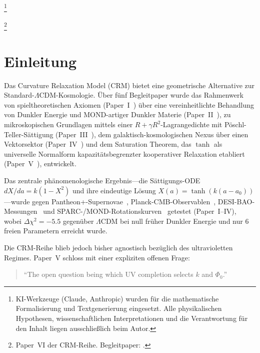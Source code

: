 \documentclass[aps,prd,twocolumn,superscriptaddress,nofootinbib]{revtex4-2}
\begin{document}

\thanks{KI-Werkzeuge (Claude, Anthropic) wurden für die mathematische Formalisierung und Textgenerierung eingesetzt. Alle physikalischen Hypothesen, wissenschaftlichen Interpretationen und die Verantwortung für den Inhalt liegen ausschließlich beim Autor.}

\thanks{Paper~VI der CRM-Reihe. Begleitpaper: \cite{Geiger2026,Geiger2026b,Geiger2026c,Geiger2026d,Geiger2026e}.}

\maketitle


\section{Einleitung}
\label{sec:introduction}

Das Curvature Relaxation Model (CRM) bietet eine geometrische Alternative zur Standard-$\Lambda$CDM-Kosmologie. Über fünf Begleitpaper wurde das Rahmenwerk von spieltheoretischen Axiomen (Paper~I~\cite{Geiger2026}) über eine vereinheitlichte Behandlung von Dunkler Energie und MOND-artiger Dunkler Materie (Paper~II~\cite{Geiger2026b}), zu mikroskopischen Grundlagen mittels einer $R + \gamma R^2$-Lagrangedichte mit Pöschl-Teller-Sättigung (Paper~III~\cite{Geiger2026c}), dem galaktisch-kosmologischen Nexus über einen Vektorsektor (Paper~IV~\cite{Geiger2026d}) und dem Saturation Theorem, das $\tanh$ als universelle Normalform kapazitätsbegrenzter kooperativer Relaxation etabliert (Paper~V~\cite{Geiger2026e}), entwickelt.

Das zentrale phänomenologische Ergebnis---die Sättigungs-ODE $dX/da = k(1-X^2)$ und ihre eindeutige Lösung $X(a) = \tanh(k(a-a_0))$---wurde gegen Pantheon+-Supernovae~\cite{Scolnic2022}, Planck-CMB-Observablen~\cite{Planck2020}, DESI-BAO-Messungen~\cite{DESI2025} und SPARC-/MOND-Rotationskurven~\cite{Milgrom1983} getestet (Paper~I--IV), wobei $\Delta\chi^2 = -5.5$ gegenüber $\Lambda$CDM bei null früher Dunkler Energie und nur 6 freien Parametern erreicht wurde.

Die CRM-Reihe blieb jedoch bisher agnostisch bezüglich des ultravioletten Regimes. Paper~V schloss mit einer expliziten offenen Frage:
\begin{quote}
``The open question being which UV completion selects $k$ and $\Phi_0$.''
\end{quote}
\end{document}

